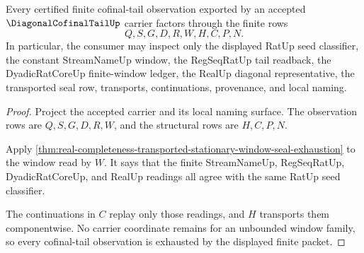 \begin{theorem}
\label{thm:diagonal-cofinal-tail-window-exhaustion}
Every certified finite cofinal-tail observation exported by an accepted $\DiagonalCofinalTailUp$ carrier factors through the finite rows
$$
Q,S,G,D,R,W,H,C,P,N.
$$
In particular, the consumer may inspect only the displayed RatUp seed classifier, the constant StreamNameUp window, the RegSeqRatUp tail readback, the DyadicRatCoreUp finite-window ledger, the RealUp diagonal representative, the transported seal row, transports, continuations, provenance, and local naming.
\end{theorem}
\begin{proof}
Project the accepted carrier and its local naming surface. The observation rows are $Q,S,G,D,R,W$, and the structural rows are $H,C,P,N$.

Apply \autoref{thm:real-completeness-transported-stationary-window-seal-exhaustion} to the window read by $W$. It says that the finite StreamNameUp, RegSeqRatUp, DyadicRatCoreUp, and RealUp readings all agree with the same RatUp seed classifier.

The continuations in $C$ replay only those readings, and $H$ transports them componentwise. No carrier coordinate remains for an unbounded window family, so every cofinal-tail observation is exhausted by the displayed finite packet.
\end{proof}

